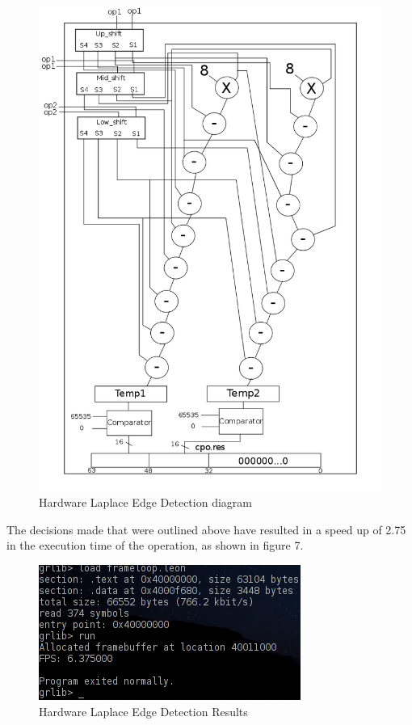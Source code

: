 \documentclass{article}
\begin{document}
	\begin{figure}[H]
		\begin{center}
			\includegraphics[scale=0.45]{./edge_detection.png}
			\caption{Hardware Laplace Edge Detection diagram}
		\end{center}
	\end{figure}

The decisions made that were outlined above have resulted in a speed up of 2.75 in the execution time of the operation, as shown in figure 7.

	 \begin{figure}[H]
	 	\begin{center}
	 		\includegraphics[scale=0.6]{../part7_files/Hardware_Laplace_edge_detection_performance.png}
	 		\caption{Hardware Laplace Edge Detection Results}
	 	\end{center}
	 \end{figure}
\end{document}
